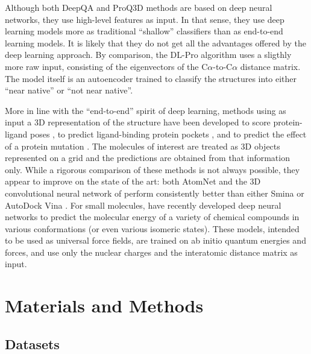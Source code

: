 \documentclass{bioinfo}
\begin{document}
Although both DeepQA and ProQ3D
methods are based on deep neural networks, they use high-level
features as input. In that sense, they use deep learning models more as
traditional ``shallow'' classifiers than as end-to-end learning
models. It is likely that they do not get all the advantages offered
by the deep learning approach.
By comparison, the DL-Pro algorithm \citep{nguyen2014dlpro} uses a
sligthly more raw input, consisting of the eigenvectors of the
C$\alpha$-to-C$\alpha$ distance matrix. The model itself is an
autoencoder \citep{hinton2006reducing} trained to classify the
structures into either ``near native'' or ``not near native''.

More in line with the ``end-to-end'' spirit of deep learning, methods
using as input a 3D representation of the structure have been
developed to score protein-ligand poses \citep{wallach2015atomnet,
ragoza2017protein}, to predict ligand-binding protein
pockets \citep{jimenez2017deepsite}, and to predict the effect of a
protein mutation \citep{torng2017}. The molecules of interest are
treated as 3D objects represented on a grid and the predictions are
obtained from that information only. While a rigorous comparison of
these methods is not always possible, they appear to
improve on the state of the art: both
AtomNet \citep{wallach2015atomnet} and the 3D convolutional neural
network of \citet{ragoza2017protein} perform
consistently better than either Smina \citep{koes2013smina} or AutoDock
Vina \citep{trott2009vina}.
For small molecules, \citet{schutt2017quantum,
schutt2017moleculenet} have recently developed deep neural networks to predict
the molecular energy of a variety of chemical compounds in various
conformations (or even various isomeric states). These models,
intended to be used as universal force fields, are trained on ab
initio quantum energies and forces, and use only the nuclear charges and the
interatomic distance matrix as input.


\section{Materials and Methods}

\subsection{Datasets}
\end{document}
